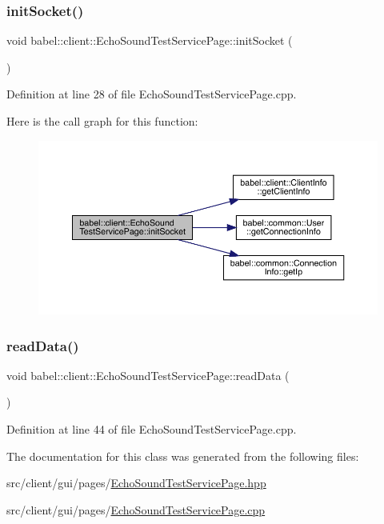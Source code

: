 \subsubsection{\texorpdfstring{init\+Socket()}{initSocket()}}
{\footnotesize\ttfamily void babel\+::client\+::\+Echo\+Sound\+Test\+Service\+Page\+::init\+Socket (\begin{DoxyParamCaption}{ }\end{DoxyParamCaption})}



Definition at line 28 of file Echo\+Sound\+Test\+Service\+Page.\+cpp.

Here is the call graph for this function\+:\nopagebreak
\begin{figure}[H]
\begin{center}
\leavevmode
\includegraphics[width=350pt]{classbabel_1_1client_1_1_echo_sound_test_service_page_a12bc0e4d7e2be59f58a57fce004751df_cgraph}
\end{center}
\end{figure}
\mbox{\label{classbabel_1_1client_1_1_echo_sound_test_service_page_aa53826e26b4b30ae45693c48614b3ea9}} 
\subsubsection{\texorpdfstring{read\+Data()}{readData()}}
{\footnotesize\ttfamily void babel\+::client\+::\+Echo\+Sound\+Test\+Service\+Page\+::read\+Data (\begin{DoxyParamCaption}{ }\end{DoxyParamCaption})}



Definition at line 44 of file Echo\+Sound\+Test\+Service\+Page.\+cpp.



The documentation for this class was generated from the following files\+:\begin{DoxyCompactItemize}
\item 
src/client/gui/pages/\mbox{\hyperlink{_echo_sound_test_service_page_8hpp}{Echo\+Sound\+Test\+Service\+Page.\+hpp}}\item 
src/client/gui/pages/\mbox{\hyperlink{_echo_sound_test_service_page_8cpp}{Echo\+Sound\+Test\+Service\+Page.\+cpp}}\end{DoxyCompactItemize}
